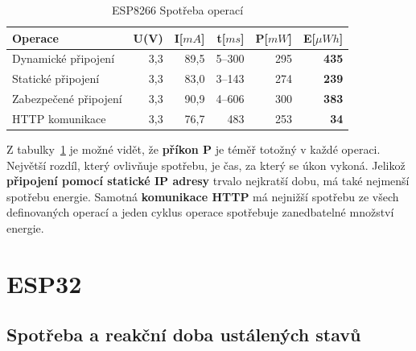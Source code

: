 \documentclass[a4paper, 12pt]{report}
\begin{document}
    \begin{table}[h]
        \centering
        \caption{ESP8266 Spotřeba operací}
        \begin{tabular}{||l| r r r r |r||}
            \hline
            Operace               & U(V) & I[$mA$] & t[$ms$] & P[$mW$] & \textbf{E}[$\mu Wh$] \\
            \hline
            \hline
            Dynamické připojení   & 3,3  & 89,5    & 5--300  & 295     & \textbf{435}         \\
            Statické připojení    & 3,3  & 83,0    & 3--143  & 274     & \textbf{239}         \\
            Zabezpečené připojení & 3,3  & 90,9    & 4--606  & 300     & \textbf{383}         \\
            HTTP komunikace       & 3,3  & 76,7    & 483     & 253     & \textbf{34}          \\
            \hline
        \end{tabular}
        \label{tab:esp8266-spotreba-operaci}
    \end{table}
    Z tabulky~\ref{tab:esp8266-spotreba-operaci} je možné vidět, že \textbf{příkon P} je téměř totožný v každé operaci. Největší rozdíl, který ovlivňuje spotřebu, je čas, za který se úkon vykoná. Jelikož \textbf{připojení pomocí statické IP adresy} trvalo nejkratší dobu, má také nejmenší spotřebu energie.
    Samotná \textbf{komunikace HTTP} má nejnižší spotřebu ze všech definovaných operací a jeden cyklus operace spotřebuje zanedbatelné množství energie.


    \section{ESP32}

    \subsection{Spotřeba a reakční doba ustálených stavů}
\end{document}
